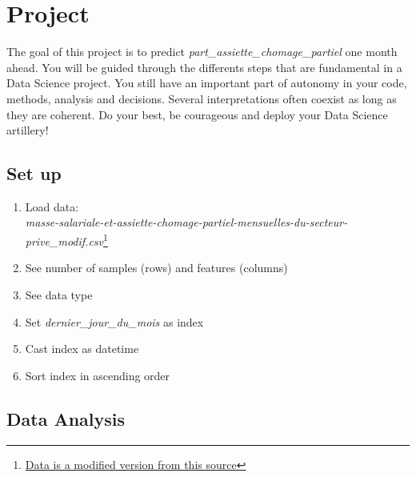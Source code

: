 
\setcounter{section}{0}


\section{Project}

The goal of this project is to predict \textit{part\_assiette\_chomage\_partiel} one month ahead.
You will be guided through the differents steps that are fundamental in a Data Science project.
You still have an important part of autonomy in your code, methods, analysis and decisions.
Several interpretations often coexist as long as they are coherent. Do your best, 
be courageous and deploy your Data Science artillery!

\subsection{Set up}

\begin{enumerate}
    \item Load data:\\
    \textit{masse-salariale-et-assiette-chomage-partiel-mensuelles-du-secteur-prive\_modif.csv}\footnote{\href{https://www.data.gouv.fr/fr/datasets/masse-salariale-et-assiette-chomage-partiel-mensuelles-du-secteur-prive/}{Data is a modified version from this source}}
    \item See number of samples (rows) and features (columns)
    \item See data type
    \item Set \textit{dernier\_jour\_du\_mois} as index
    \item Cast index as datetime
    \item Sort index in ascending order
\end{enumerate}


\subsection{Data Analysis}

